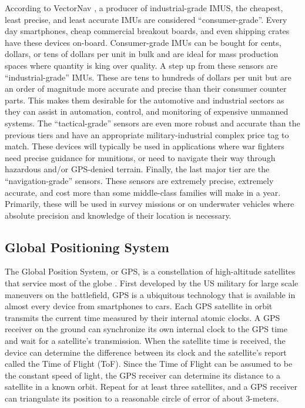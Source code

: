 According to VectorNav \cite{VectorNav:2023}, a producer of industrial-grade IMUS, the cheapest, least precise, and least accurate IMUs are considered ``consumer-grade''.
Every day smartphones, cheap commercial breakout boards, and even shipping crates have these devices on-board.
Consumer-grade IMUs can be bought for cents, dollars, or tens of dollars per unit in bulk and are ideal for mass production spaces where quantity is king over quality.
A step up from these sensors are ``industrial-grade'' IMUs. 
These are tens to hundreds of dollars per unit but are an order of magnitude more accurate and precise than their consumer counter parts.
This makes them desirable for the automotive and industrial sectors as they can assist in automation, control, and monitoring of expensive unmanned systems.
The ``tactical-grade'' sensors are even more robust and accurate than the previous tiers and have an appropriate military-industrial complex price tag to match. 
These devices will typically be used in applications where war fighters need precise guidance for munitions, or need to navigate their way through hazardous and/or GPS-denied terrain.
Finally, the last major tier are the ``navigation-grade'' sensors. 
These sensors are extremely precise, extremely accurate, and cost more than some middle-class families will make in a year.
Primarily, these will be used in survey missions or on underwater vehicles where absolute precision and knowledge of their location is necessary.

\subsection{Global Positioning System} 
The Global Position System, or GPS, is a constellation of high-altitude satellites that service most of the globe \cite{Hofmann:2001}.
First developed by the US military for large scale maneuvers on the battlefield, GPS is a ubiquitous technology that is available in almost every device from smartphones to cars.
Each GPS satellite in orbit transmits the current time measured by their internal atomic clocks.
A GPS receiver on the ground can synchronize its own internal clock to the GPS time and wait for a satellite's transmission.
When the satellite time is received, the device can determine the difference between its clock and the satellite's report called the Time of Flight (ToF).
Since the Time of Flight can be assumed to be the constant speed of light, the GPS receiver can determine its distance to a satellite in a known orbit.
Repeat for at least three satellites, and a GPS receiver can triangulate its position to a reasonable circle of error of about 3-meters.

